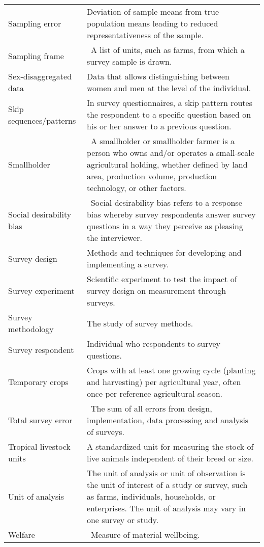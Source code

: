\documentclass[
]{book}
\begin{document}
\begin{longtable}[]{@{}ll@{}}
Sampling error & Deviation of sample means from true population means leading to reduced representativeness of the sample. \\
Sampling frame & ~A list of units, such as farms, from which a survey sample is drawn. \\
Sex-disaggregated data & Data that allows distinguishing between women and men at the level of the individual. \\
Skip sequences/patterns & In survey questionnaires, a skip pattern routes the respondent to a specific question based on his or her answer to a previous question. \\
Smallholder & ~A smallholder or smallholder farmer is a person who owns and/or operates a small-scale agricultural holding, whether defined by land area, production volume, production technology, or other factors. \\
Social desirability bias & ~Social desirability bias refers to a response bias whereby survey respondents answer survey questions in a way they perceive as pleasing the interviewer. \\
Survey design & Methods and techniques for developing and implementing a survey. \\
Survey experiment & Scientific experiment to test the impact of survey design on measurement through surveys. \\
Survey methodology & The study of survey methods. \\
Survey respondent & Individual who respondents to survey questions. \\
Temporary crops & Crops with at least one growing cycle (planting and harvesting) per agricultural year, often once per reference agricultural season. \\
Total survey error & ~The sum of all errors from design, implementation, data processing and analysis of surveys. \\
Tropical livestock units & A standardized unit for measuring the stock of live animals independent of their breed or size. \\
Unit of analysis & The unit of analysis or unit of observation is the unit of interest of a study or survey, such as farms, individuals, households, or enterprises. The unit of analysis may vary in one survey or study. \\
Welfare & ~Measure of material wellbeing. \\
\bottomrule
\end{longtable}
\end{document}
